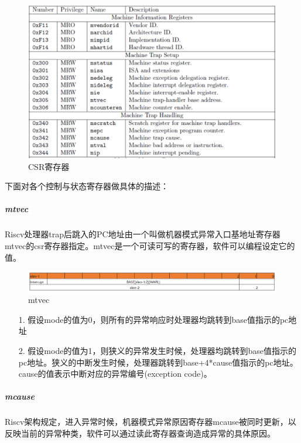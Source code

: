 \begin{figure}[H] %
    \centering %
    \includegraphics[width=1.0\textwidth]{figs/csrregs.png} %
    \caption{CSR寄存器} %
    \label{Fig.2} %
\end{figure}

下面对各个控制与状态寄存器做具体的描述：
\subparagraph{mtvec}
Riscv处理器trap后跳入的PC地址由一个叫做机器模式异常入口基地址寄存器mtvec的csr寄存器指定。mtvec是一个可读可写的寄存器，软件可以编程设定它的值。

\begin{figure}[H] %
    \centering %
    \includegraphics[width=1.0\textwidth]{figs/mtvec.png} %
    \caption{mtvec} %
    \label{Fig.3} %
\end{figure}

\begin{itemize}
    \item [1.] 假设mode的值为0，则所有的异常响应时处理器均跳转到base值指示的pc地址
    \item [2.] 假设mode的值为1，则狭义的异常发生时候，处理器均跳转到base值指示的pc地址。狭义的中断发生时候，处理器跳转到base+4*cause值指示的pc地址。cause的值表示中断对应的异常编号(exception code)。
\end{itemize}

\subparagraph{mcause}
Riscv架构规定，进入异常时候，机器模式异常原因寄存器mcause被同时更新，以反映当前的异常种类，软件可以通过读此寄存器查询造成异常的具体原因。

